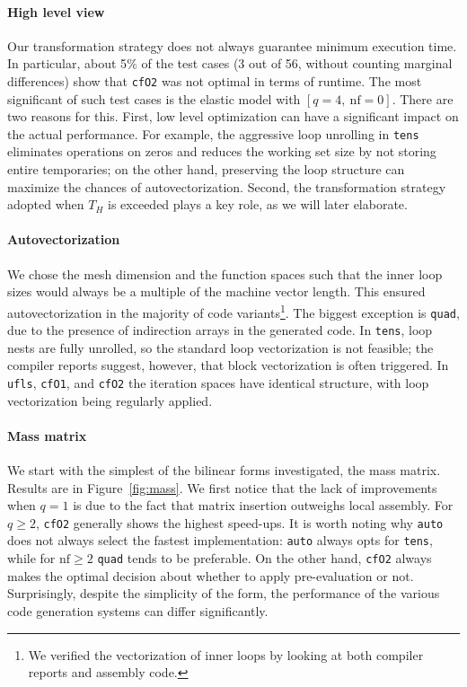 \paragraph{High level view}
Our transformation strategy does not always guarantee minimum execution time. In particular, about 5$\%$ of the test cases (3 out of 56, without counting marginal differences) show that \texttt{cfO2} was not optimal in terms of runtime. The most significant of such test cases is the elastic model with $[q=4,\ \mathrm{nf}=0]$. There are two reasons for this. First, low level optimization can have a significant impact on the actual performance. For example, the aggressive loop unrolling in \texttt{tens} eliminates operations on zeros and reduces the working set size by not storing entire temporaries; on the other hand, preserving the loop structure can maximize the chances of autovectorization. Second, the transformation strategy adopted when $T_H$ is exceeded plays a key role, as we will later elaborate.

\paragraph{Autovectorization}
 
We chose the mesh dimension and the function spaces such that the inner loop sizes would always be a multiple of the machine vector length. This ensured autovectorization in the majority of code variants\footnote{We verified the vectorization of inner loops by looking at both compiler reports and assembly code.}. The biggest exception is \texttt{quad}, due to the presence of indirection arrays in the generated code. In \texttt{tens}, loop nests are fully unrolled, so the standard loop vectorization is not feasible; the compiler reports suggest, however, that block vectorization \citep{SLP-vect} is often triggered. In \texttt{ufls}, \texttt{cfO1}, and \texttt{cfO2} the iteration spaces have identical structure, with loop vectorization being regularly applied.

\paragraph{Mass matrix}
We start with the simplest of the bilinear forms investigated, the mass matrix. Results are in Figure~\ref{fig:mass}. We first notice that the lack of improvements when $q=1$ is due to the fact that matrix insertion outweighs local assembly. For $q \geq 2$, \texttt{cfO2} generally shows the highest speed-ups. It is worth noting why \texttt{auto} does not always select the fastest implementation: \texttt{auto} always opts for \texttt{tens}, while for $\mathrm{nf} \geq 2$ \texttt{quad} tends to be preferable. On the other hand, \texttt{cfO2} always makes the optimal decision about whether to apply pre-evaluation or not. Surprisingly, despite the simplicity of the form, the performance of the various code generation systems can differ significantly.

